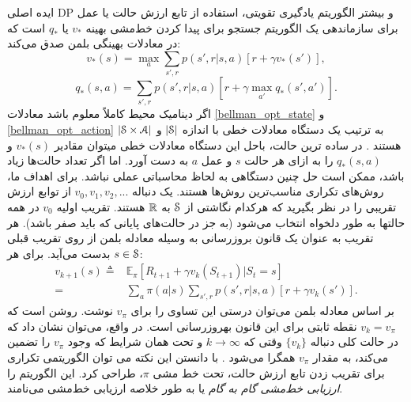 ایده اصلی DP و بیشتر الگوریتم یادگیری تقویتی‌، استفاده از تابع ارزش حالت یا عمل برای سازماندهی یک الگوریتم جستجو برای پیدا کردن خط‌مشی بهینه
$v_*$
یا
$q_*$
است
که در معادلات بهینگی بلمن صدق می‌کند:
\begin{equation}
v_{*}(s) = \max_{a} \sum_{s',r} p(s',r | s,a)[r + \gamma v_*(s')],
\label{bellman_opt_state}
\end{equation}
\begin{equation}
q_{*}(s,a) = \sum_{s',r} p(s',r | s,a)[r + \gamma \max_{a'} q_* (s',a')].
\label{bellman_opt_action}
\end{equation}
اگر دینامیک محیط کاملاً معلوم باشد معادلات
\ref{bellman_opt_state}
و
\ref{bellman_opt_action}
به ترتیب یک دستگاه معادلات خطی با اندازه
 $|\EuScript{S}|$
 و
 $|\EuScript{S} \times \EuScript{A}|$
  هستند \cite{suttonbook}.
در ساده ترین حالت، باحل این دستگاه معادلات  خطی می\nf توان  مقادیر 
$v_*(s)$
و
$q_*(s,a)$
را به ازای هر حالت $s$ و عمل $a$ به دست آورد. اما اگر تعداد حالت‌ها زیاد باشد، ممکن است حل چنین دستگاهی به لحاظ محاسباتی عملی نباشد. برای اهداف ما، روش‌های تکراری مناسب‌ترین روش‌ها هستند. یک دنباله $ v_0 , v_1 , v_2 , ...$ 
از توابع ارزش تقریبی
را در نظر بگیرید که هرکدام نگاشتی از
$\EuScript{S}$ 
به 
$\mathbb{R}$
 هستند.
تقریب اولیه $v_0$
در همه حالت\nf ها
به طور دلخواه انتخاب می‌شود (به جز در حالت‌های پایانی که باید صفر باشد). هر تقریب به عنوان یک قانون بروزرسانی به وسیله معادله بلمن از روی تقریب قبلی بدست می‌آید. برای هر 
$s \in \EuScript{S}$:
\begin{align}
v_{k+1}(s) \triangleq & \mathbb{E}_{\pi} [R_{t+1} + \gamma v_k(S_{t+1}) | S_t=s]  \nonumber \\
=& \sum_{a} \pi(a|s) \sum_{s',r} p(s',r | s,a)[r + \gamma v_k(s')].
\end{align}
بر اساس معادله بلمن می‌توان درستی این تساوی را برای 
$v_{\pi}$
نوشت. روشن است که 
 $v_k = v_{\pi}$
 نقطه ثابتی برای این قانون به\nf روز\nf رسانی است.
 در واقع، می‌توان نشان داد که در حالت کلی دنباله 
 $\{ v_k \}$
وقتی که 
$ k \rightarrow \infty $
و تحت همان شرایط که وجود 
$v_{\pi}$
را تضمین می‌کند، به مقدار 
$v_{\pi}$
همگرا می‌شود \cite{suttonbook}. با دانستن این نکته می توان الگوریتمی تکراری برای  تقریب زدن تابع ارزش حالت، تحت خط مشی $\pi$، طراحی کرد. این الگوریتم را 
\textit{ارزیابی خط‌مشی گام به گام}
 یا به طور خلاصه 
ارزیابی خط‌مشی
 می‌نامند.


